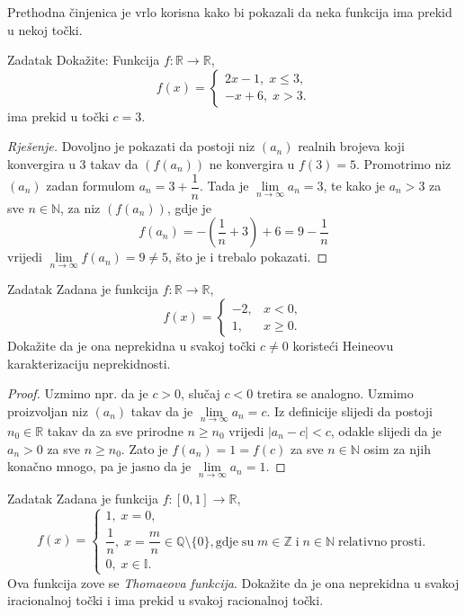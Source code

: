 Prethodna činjenica je vrlo korisna kako bi pokazali da neka funkcija ima prekid u nekoj točki.
\begin{exercise}{Zadatak} Dokažite: Funkcija \(f : \mathbb{R}\to \mathbb{R}\), \[f(x)=\begin{cases}
2x-1,\; x\leq 3,\\
-x+6,\; x>3.
\end{cases}\]
ima prekid u točki \(c=3\).
\end{exercise}
\begin{proof}[Rješenje]
Dovoljno je pokazati da postoji niz \((a_n)\) realnih brojeva koji konvergira u \(3\) takav da \(\left(f(a_n)\right)\) ne konvergira u \(f(3)=5\). Promotrimo niz \((a_n)\) zadan formulom \(a_n=3+\dfrac{1}{n}\). Tada je \(\lim\limits_{n\to \infty}{a_n}=3\), te kako je \(a_n>3\) za sve \(n\in \mathbb{N}\), za niz \(\left(f(a_n)\right)\), gdje je
\[f(a_n)=-\left(\dfrac{1}{n}+3\right)+6=9-\dfrac{1}{n}\]
vrijedi \(\lim\limits_{n\to \infty}{f(a_n)}=9\neq 5\), što je i trebalo pokazati.
\end{proof}
\begin{exercise}{Zadatak}
Zadana je funkcija \(f : \mathbb{R}\to \mathbb{R}\),
\[f(x)=\begin{cases}
-2, & x<0,\\
1, & x\geq 0.
\end{cases}\]
Dokažite da je ona neprekidna u svakoj točki \(c\neq 0\) koristeći Heineovu karakterizaciju neprekidnosti.
\end{exercise}
\begin{proof}
Uzmimo npr. da je \(c>0\), slučaj \(c<0\) tretira se analogno. Uzmimo proizvoljan niz \((a_n)\) takav da je \(\lim\limits_{n\to \infty}{a_n}=c\). Iz definicije slijedi da postoji \(n_0\in \mathbb{R}\) takav da za sve prirodne \(n\geq n_0\) vrijedi \(|a_n-c|<c\), odakle slijedi da je \(a_n>0\) za sve \(n\geq n_0\). Zato je \(f(a_n)=1=f(c)\) za sve \(n\in \mathbb{N}\) osim za njih konačno mnogo, pa je jasno da je \(\lim\limits_{n\to \infty}{a_n}=1\).
\end{proof}
\begin{exercise}{Zadatak}
Zadana je funkcija \(f : [0, 1]\to \mathbb{R}\), \[f(x)=\begin{cases}
1, \; x=0,\\
\dfrac{1}{n},\; x=\dfrac{m}{n}\in \mathbb{Q}\setminus\{0\},\mathrm{gdje\;su\;}m\in \mathbb{Z}\mathrm{\;i\;}n\in \mathbb{N}\mathrm{\;relativno\;prosti.}\\
0,\; x\in \mathbb{I}.
\end{cases}\]
Ova funkcija zove se \textit{Thomaeova funkcija}. Dokažite da je ona neprekidna u svakoj iracionalnoj točki i ima prekid u svakoj racionalnoj točki.
\end{exercise}
